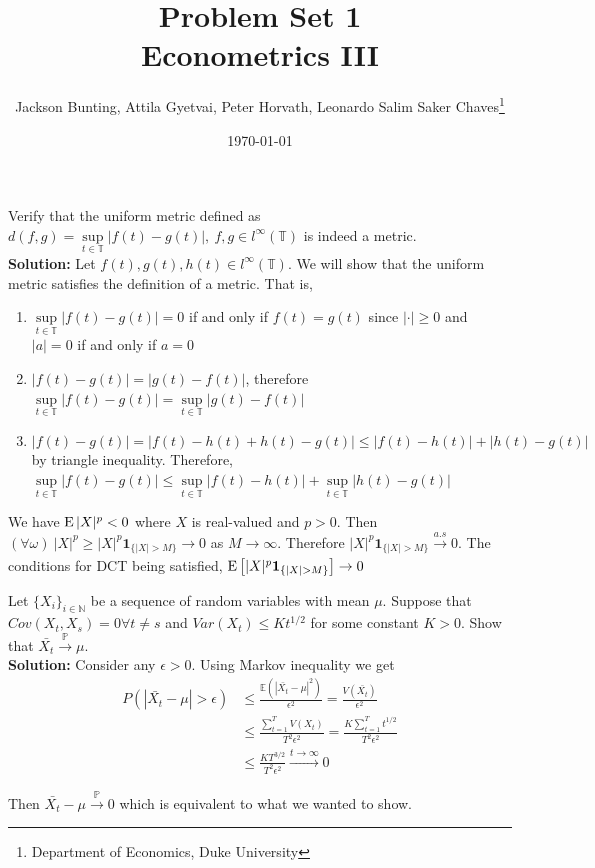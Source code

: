 \documentclass[11pt,letterpaper]{article}                  %
\title{Problem Set 1 \\ \medskip \Large{Econometrics III}}
\author{\Large Jackson Bunting, Attila Gyetvai, Peter Horvath, Leonardo Salim Saker Chaves\footnote{Department of Economics, Duke University}}
\date{\today}
\begin{document}
\maketitle
\begin{problem}
Verify that the uniform metric defined as $d (f, g) = \sup\limits_{t \in \mathbb{T}} |f(t) - g(t)|, \:  f, g \in l^{\infty}(\mathbb{T})$ is indeed a metric. \\

\textbf{Solution:} Let $f(t), g(t), h(t) \in l^{\infty}(\mathbb{T})$. We will show that the uniform metric satisfies the definition of a metric. That is, 
\begin{enumerate}
	\item  $\sup\limits_{t \in \mathbb{T}} |f(t) - g(t)| = 0$ if and only if $f(t) = g(t)$ since $|\cdot| \geq 0$ and $|a| = 0$ if and only if $a = 0$
	\item  $|f(t) - g(t)| = |g(t) - f(t)|$, therefore $\sup\limits_{t \in \mathbb{T}} |f(t) - g(t)| = \sup\limits_{t \in \mathbb{T}} |g(t) - f(t)|$
	\item $|f(t) - g(t)| = |f(t) - h(t) + h(t) - g(t)| \leq |f(t) - h(t)| +  |h(t) - g(t)|$ by triangle inequality. Therefore, $\sup\limits_{t \in \mathbb{T}} |f(t) - g(t)| \leq  \sup\limits_{t \in \mathbb{T}} |f(t) - h(t)| + \sup\limits_{t \in \mathbb{T}} |h(t) - g(t)|$
\end{enumerate}
\end{problem}

\bigskip
\begin{problem}
We have $\operatorname{E}|X|^p < 0$ where $X$ is real-valued and $p > 0$. Then
$(\forall \omega ) \  |X|^p \ge |X|^p \mathbf{1}_{\{|X|>M\}}
\rightarrow 0$ as $M \rightarrow \infty$. Therefore $|X|^p \mathbf{1}_{\{|X|>M\}}
\xrightarrow[]{a.s} 0$. The conditions for DCT being satisfied, $\E \left[|X|^p \mathbf{1}_{\{|X|>M\}}\right]
\rightarrow 0$
\end{problem}

\bigskip
\begin{problem}
Let $\{X_i\}_{i \in \mathbb{N}}$ be a sequence of random variables with mean $\mu$. Suppose that $Cov(X_t,X_s)=0 \forall t\neq s$ and $Var(X_t) \leq Kt^{1/2}$ for some constant $K>0$. Show that $\bar{X_t} \overset{\mathbb{P}}{\rightarrow} \mu$.\\

\textbf{Solution:} Consider any $\epsilon>0$. Using Markov inequality we get
\begin{align*}
P(|\bar{X_t} - \mu| > \epsilon) &\leq \frac{\mathbb{E}( |\bar{X_t} - \mu|^2)}{\epsilon^2} = \frac{V(\bar{X_t})}{\epsilon^2} \\
&\leq \frac{\sum_{t=1}^T V(X_t)}{T^2 \epsilon^2} = \frac{K \sum_{t=1}^T t^{1/2}}{T^2 \epsilon^2} \\
&\leq \frac{K T^{3/2}}{T^2 \epsilon^2} \overset{t \to \infty}{\longrightarrow} 0
\end{align*}

Then $\bar{X_t} - \mu \overset{\mathbb{P}}{\rightarrow} 0$ which is equivalent to what we wanted to show.
\end{problem}
\end{document}
